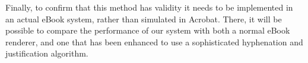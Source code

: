 \documentclass{sig-alternate}
\begin{document}
Finally, to confirm that this method has validity it needs to be implemented in an actual eBook system, rather than simulated in Acrobat. There, it will be possible to compare the performance of our system with both a normal eBook renderer, and one that has been enhanced to use a sophisticated hyphenation and justification algorithm.




\end{document}
